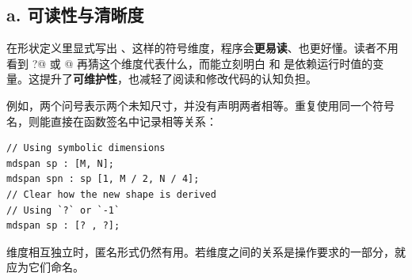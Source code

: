 \subsection*{\textbf{a. 可读性与清晰度}}

在形状定义里显式写出 \co@M@、\co@N@ 这样的符号维度，程序会\textbf{更易读}、也更好懂。读者不用看到 \co@?@ 或 @ 再猜这个维度代表什么，而能立刻明白 \co@M@ 和 \co@N@ 是依赖运行时值的变量。这提升了\textbf{可维护性}，也减轻了阅读和修改代码的认知负担。

例如，两个问号表示两个未知尺寸，并没有声明两者相等。重复使用同一个符号名，则能直接在函数签名中记录相等关系：

\begin{lstlisting}[language=croqtile,caption={a. 可读性与清晰度}]
// Using symbolic dimensions
mdspan sp : [M, N];
mdspan spn : sp [1, M / 2, N / 4];
// Clear how the new shape is derived
// Using `?` or `-1`
mdspan sp : [? , ?];
\end{lstlisting}

维度相互独立时，匿名形式仍然有用。若维度之间的关系是操作要求的一部分，就应为它们命名。
